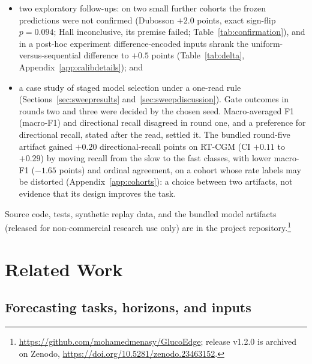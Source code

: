 \documentclass[10pt,twocolumn]{article}
\begin{document}
\begin{itemize}
    Torch 0.9.1 produces: every INT8 artifact of the 2,909-parameter study
    model has the same size and operator inventory, selection takes under
    0.03~s, and a prespecified nine-artifact iPhone benchmark found the
    calibration arms within 0.05~$\mu$s of each other, so the corrected
    calibration is free at deployment. That hybrid INT8 graph was never
    faster than float, and its artifacts are 31\% smaller than float for
    the study model and 70\% for the bundled one;
    \item two exploratory follow-ups: on two small further cohorts the
    frozen predictions were not confirmed (Dubosson $+2.0$ points, exact
    sign-flip $p=0.094$; Hall inconclusive, its premise failed;
    Table~\ref{tab:confirmation}), and in a post-hoc experiment
    difference-encoded inputs shrank the uniform-versus-sequential
    difference to $+0.5$ points (Table~\ref{tab:delta},
    Appendix~\ref{app:calibdetails}); and
    \item a case study of staged model selection under a one-read rule
    (Sections~\ref{sec:sweepresults} and~\ref{sec:sweepdiscussion}). Gate
    outcomes in rounds two and three were decided by the chosen seed.
    Macro-averaged F1 (macro-F1) and directional recall disagreed in round
    one, and a preference for directional recall, stated after the read,
    settled it. The bundled round-five artifact gained $+0.20$
    directional-recall points on RT-CGM (CI $+0.11$ to $+0.29$) by moving
    recall from the slow to the fast classes, with lower macro-F1 ($-1.65$
    points) and ordinal agreement, on a cohort whose rate labels may be
    distorted (Appendix~\ref{app:cohorts}): a choice between two
    artifacts, not evidence that its design improves the task.
\end{itemize}

Source code, tests, synthetic replay data, and the bundled model artifacts
(released for non-commercial research use only) are in the project
repository.\footnote{\url{https://github.com/mohamedmenasy/GlucoEdge}; release
  v1.2.0 is archived on Zenodo, \url{https://doi.org/10.5281/zenodo.23463152}.}

\section{Related Work}

\subsection{Forecasting tasks, horizons, and inputs}
\end{document}
